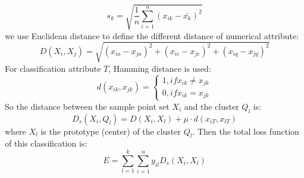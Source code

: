 \begin{equation}
	s_{k} = \sqrt{\frac{1}{n}\sum_{i=1}^{n}(x_{ik}-\bar{x_{k}})^{2}}
\label{s_k}
\end{equation}
we use Euclidean distance to define the different distance of numerical attribute:
\begin{equation}
	D(X_{i},X_{j})=\sqrt{(x_{ia}-x_{ja})^{2}+(x_{ic}-x_{jc})^2+(x_{iq}-x_{jq})^{2}}
\label{D}
\end{equation}
For classification attribute $T$, Hamming distance is used:
\begin{equation}
	d(x_{ik},x_{jk})=\left\{\begin{matrix}
	1, if x_{ik} \neq x_{jk}\\ 
	0, if x_{ik} = x_{jk}
\end{matrix}\right.
\label{d}
\end{equation}
So the distance between the sample point set $X_{i}$ and the cluster $Q_{l}$ is:
\begin{equation}
	D_{s}(X_{i},Q_{l})=D(X_{i},X_{l})+\mu \cdot d(x_{iT},x_{lT}) 
\label{D_s}
\end{equation}
where $X_{l}$ is the prototype (center) of the cluster $Q_{l}$. Then the total loss function of this classification is:
\begin{equation}
	E= \sum_{l=1}^{k}\sum_{i=1}^{n}y_{il}D_{s}(X_{i},X_{l})
\label{E}
\end{equation}
